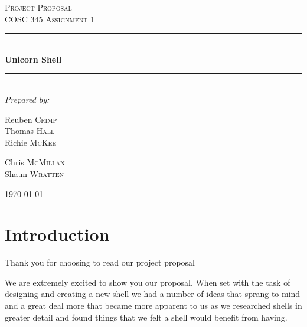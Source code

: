\documentclass[a4paper,12pt]{article}
\begin{document}



\begin{titlepage}

  \newcommand{\HRule}{\rule{\linewidth}{0.5mm}}
  \center
  \textsc{\LARGE Project Proposal}\\[0.5cm] 
  \textsc{\large COSC 345 Assignment 1}\\[0.5cm] 

  \HRule \\[0.6cm]
         { \huge \bfseries Unicorn Shell}\\[0.4cm]
         \HRule \\[1.5cm]
         
         \Large \emph{Prepared by:}\\
         \begin{multicols}{3}
           Reuben \textsc{Crimp}\\
           Thomas \textsc{Hall}\\
           Richie \textsc{McKee}\\           
         \end{multicols}
         \begin{multicols}{2}
           Chris \textsc{McMillan}\\
           Shaun \textsc{Wratten}\\           
         \end{multicols}
         
         \null\vfill{\large \today}\\[3cm]
\end{titlepage}

\section*{Introduction}
Thank you for choosing to read our project proposal

We are extremely excited to show you our proposal. When set with the task of designing and creating a new shell we had a number of ideas that sprang to mind and a great deal more that became more apparent to us as we researched shells in greater detail and found things that we felt a shell would benefit from having.
\end{document}
